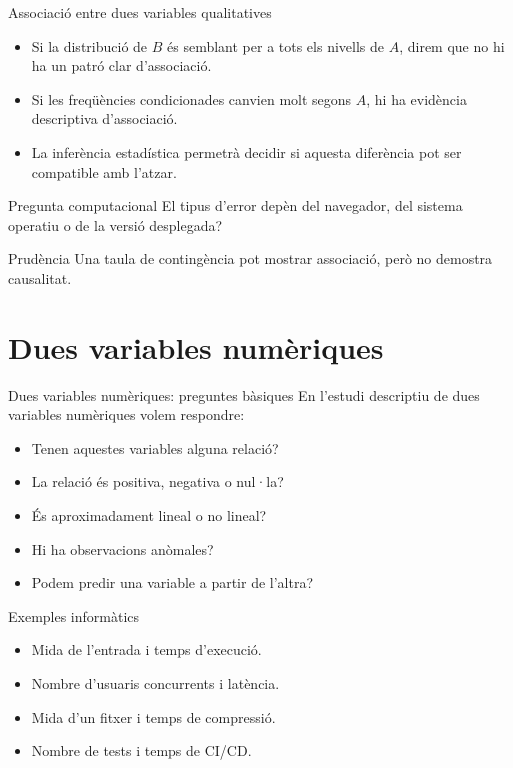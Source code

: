 \documentclass[10pt,aspectratio=169]{beamer}
\begin{document}
\begin{frame}{Associació entre dues variables qualitatives}
\begin{itemize}
  \item Si la distribució de $B$ és semblant per a tots els nivells de $A$, direm que no hi ha un patró clar d'associació.
  \item Si les freqüències condicionades canvien molt segons $A$, hi ha evidència descriptiva d'associació.
  \item La inferència estadística permetrà decidir si aquesta diferència pot ser compatible amb l'atzar.
\end{itemize}
\vspace{0.3cm}
\begin{exampleblock}{Pregunta computacional}
El tipus d'error depèn del navegador, del sistema operatiu o de la versió desplegada?
\end{exampleblock}
\begin{alertblock}{Prudència}
Una taula de contingència pot mostrar associació, però no demostra causalitat.
\end{alertblock}
\end{frame}

\section{Dues variables numèriques}

\begin{frame}{Dues variables numèriques: preguntes bàsiques}
En l'estudi descriptiu de dues variables numèriques volem respondre:
\begin{itemize}
  \item Tenen aquestes variables alguna relació?
  \item La relació és positiva, negativa o nul·la?
  \item És aproximadament lineal o no lineal?
  \item Hi ha observacions anòmales?
  \item Podem predir una variable a partir de l'altra?
\end{itemize}
\vspace{0.25cm}
\begin{exampleblock}{Exemples informàtics}
\begin{itemize}
  \item Mida de l'entrada i temps d'execució.
  \item Nombre d'usuaris concurrents i latència.
  \item Mida d'un fitxer i temps de compressió.
  \item Nombre de tests i temps de CI/CD.
\end{itemize}
\end{exampleblock}
\end{frame}
\end{document}
